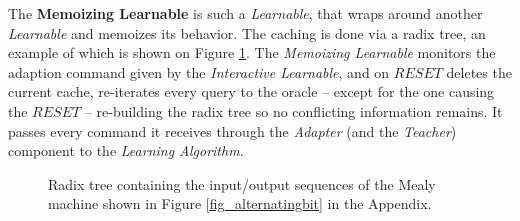 The \textbf{Memoizing Learnable} is such a \textit{Learnable}, that wraps around another \textit{Learnable} and memoizes its behavior. The caching is done via a radix tree, an example of which is shown on Figure \ref{fig_impl_radix_example}. The \textit{Memoizing Learnable} monitors the adaption command given by the \textit{Interactive Learnable}, and on $RESET$ deletes the current cache, re-iterates every query to the oracle -- except for the one causing the $RESET$ -- re-building the radix tree so no conflicting information remains. It passes every command it receives through the \textit{Adapter} (and the \textit{Teacher}) component to the \textit{Learning Algorithm}.

\begin{figure}[!ht] 
	\centering
	\caption{Radix tree containing the input/output sequences of the Mealy machine shown in Figure \ref{fig_alternatingbit} in the Appendix.} 
	\label{fig_impl_radix_example}
\end{figure}